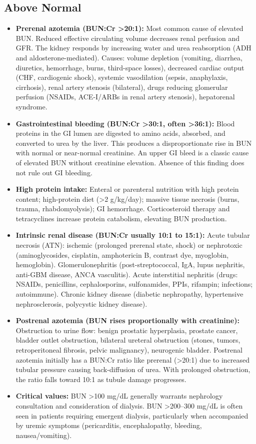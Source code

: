 \subsection*{Above Normal}
\begin{itemize}
  \item \textbf{Prerenal azotemia (BUN:Cr >20:1):} Most common cause of elevated BUN. Reduced effective circulating volume decreases renal perfusion and GFR. The kidney responds by increasing water and urea reabsorption (ADH and aldosterone-mediated). Causes: volume depletion (vomiting, diarrhea, diuretics, hemorrhage, burns, third-space losses), decreased cardiac output (CHF, cardiogenic shock), systemic vasodilation (sepsis, anaphylaxis, cirrhosis), renal artery stenosis (bilateral), drugs reducing glomerular perfusion (NSAIDs, ACE-I/ARBs in renal artery stenosis), hepatorenal syndrome.
  \item \textbf{Gastrointestinal bleeding (BUN:Cr >30:1, often >36:1):} Blood proteins in the GI lumen are digested to amino acids, absorbed, and converted to urea by the liver. This produces a disproportionate rise in BUN with normal or near-normal creatinine. An upper GI bleed is a classic cause of elevated BUN without creatinine elevation. Absence of this finding does not rule out GI bleeding.
  \item \textbf{High protein intake:} Enteral or parenteral nutrition with high protein content; high-protein diet (>2 g/kg/day); massive tissue necrosis (burns, trauma, rhabdomyolysis); GI hemorrhage. Corticosteroid therapy and tetracyclines increase protein catabolism, elevating BUN production.
  \item \textbf{Intrinsic renal disease (BUN:Cr usually 10:1 to 15:1):} Acute tubular necrosis (ATN): ischemic (prolonged prerenal state, shock) or nephrotoxic (aminoglycosides, cisplatin, amphotericin B, contrast dye, myoglobin, hemoglobin). Glomerulonephritis (post-streptococcal, IgA, lupus nephritis, anti-GBM disease, ANCA vasculitis). Acute interstitial nephritis (drugs: NSAIDs, penicillins, cephalosporins, sulfonamides, PPIs, rifampin; infections; autoimmune). Chronic kidney disease (diabetic nephropathy, hypertensive nephrosclerosis, polycystic kidney disease).
  \item \textbf{Postrenal azotemia (BUN rises proportionally with creatinine):} Obstruction to urine flow: benign prostatic hyperplasia, prostate cancer, bladder outlet obstruction, bilateral ureteral obstruction (stones, tumors, retroperitoneal fibrosis, pelvic malignancy), neurogenic bladder. Postrenal azotemia initially has a BUN:Cr ratio like prerenal (>20:1) due to increased tubular pressure causing back-diffusion of urea. With prolonged obstruction, the ratio falls toward 10:1 as tubule damage progresses.
  \item \textbf{Critical values:} BUN >100 mg/dL generally warrants nephrology consultation and consideration of dialysis. BUN >200--300 mg/dL is often seen in patients requiring emergent dialysis, particularly when accompanied by uremic symptoms (pericarditis, encephalopathy, bleeding, nausea/vomiting).
\end{itemize}

